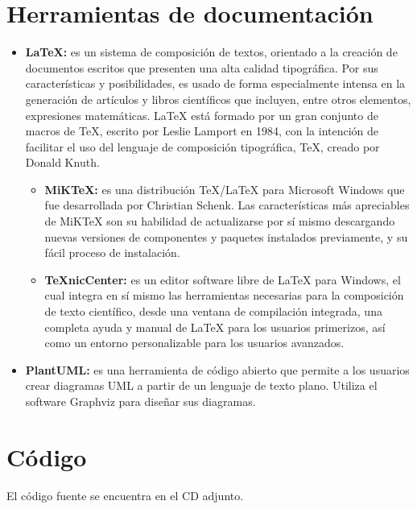 \section{Herramientas de documentación}
	
		\begin{itemize}
			\item \textbf{LaTeX:} es un sistema de composición de textos, orientado a la creación de documentos escritos que presenten una alta calidad tipográfica. Por sus características y posibilidades, es usado de forma especialmente intensa en la generación de artículos y libros científicos que incluyen, entre otros elementos, expresiones matemáticas.
			LaTeX está formado por un gran conjunto de macros de TeX, escrito por Leslie Lamport en 1984, con la intención de facilitar el uso del lenguaje de composición tipográfica, TeX, creado por Donald Knuth.
				\begin{itemize}
				\item \textbf{MiKTeX:} es una distribución TeX/LaTeX para Microsoft Windows que fue desarrollada por Christian Schenk.
				Las características más apreciables de MiKTeX son su habilidad de actualizarse por sí mismo descargando nuevas versiones de componentes y paquetes instalados previamente, y su fácil proceso de instalación.
				\item \textbf{TeXnicCenter:} es un editor software libre de LaTeX para Windows, el cual integra en sí mismo las herramientas necesarias para la composición de texto científico, desde una ventana de compilación integrada, una completa ayuda y manual de LaTeX para los usuarios primerizos, así como un entorno personalizable para los usuarios avanzados.
				\end{itemize}
			
			\item \textbf{PlantUML:} es una herramienta de código abierto que permite a los usuarios crear diagramas UML a partir de un lenguaje de texto plano. Utiliza el software Graphviz para diseñar sus diagramas.
		\end{itemize}
		
	\section{Código}
	El código fuente se encuentra en el CD adjunto.